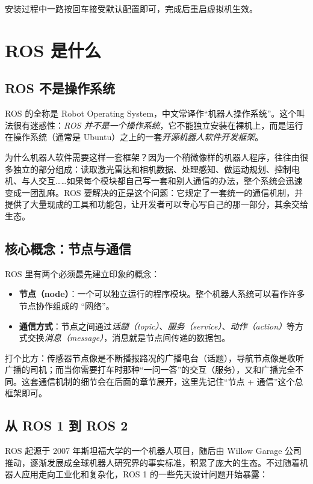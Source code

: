 \documentclass[12pt,a4paper]{ctexbook}
\begin{document}
安装过程中一路按回车接受默认配置即可，完成后重启虚拟机生效。

\section{ROS 是什么}

\subsection{ROS 不是操作系统}

ROS 的全称是 Robot Operating System，中文常译作``机器人操作系统''。这个叫法很有迷惑性：\emph{ROS 并不是一个操作系统}，它不能独立安装在裸机上，而是运行在操作系统（通常是 Ubuntu）之上的一套\emph{开源机器人软件开发框架}。

为什么机器人软件需要这样一套框架？因为一个稍微像样的机器人程序，往往由很多独立的部分组成：读取激光雷达和相机数据、处理感知、做运动规划、控制电机、与人交互……如果每个模块都自己写一套和别人通信的办法，整个系统会迅速变成一团乱麻。ROS 要解决的正是这个问题：它规定了一套统一的通信机制，并提供了大量现成的工具和功能包，让开发者可以专心写自己的那一部分，其余交给生态。

\subsection{核心概念：节点与通信}

ROS 里有两个必须最先建立印象的概念：

\begin{itemize}
    \item \textbf{节点（node）}：一个可以独立运行的程序模块。整个机器人系统可以看作许多节点协作组成的 ``网络''。
    \item \textbf{通信方式}：节点之间通过\emph{话题（topic）}、\emph{服务（service）}、\emph{动作（action）}等方式交换\emph{消息（message）}，消息就是节点间传递的数据包。
\end{itemize}

打个比方：传感器节点像是不断播报路况的广播电台（话题），导航节点像是收听广播的司机；而当你需要打车时那种``一问一答''的交互（服务），又和广播完全不同。这套通信机制的细节会在后面的章节展开，这里先记住``节点 + 通信''这个总框架即可。

\subsection{从 ROS 1 到 ROS 2}

ROS 起源于 2007 年斯坦福大学的一个机器人项目，随后由 Willow Garage 公司推动，逐渐发展成全球机器人研究界的事实标准，积累了庞大的生态。不过随着机器人应用走向工业化和复杂化，ROS 1 的一些先天设计问题开始暴露：
\end{document}
